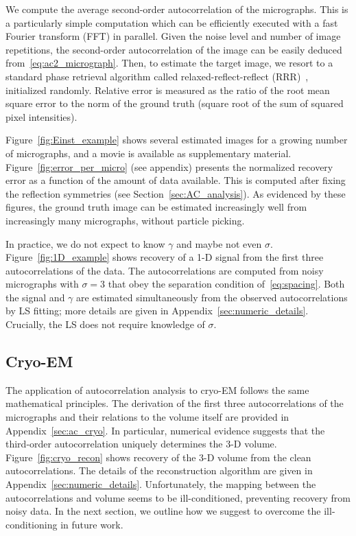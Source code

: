 \documentclass[9pt,twocolumn,twoside,lineno]{pnas-new}
\begin{document}
We compute the average second-order autocorrelation of the micrographs. This is a particularly simple computation which can be efficiently executed with a fast Fourier transform (FFT) in parallel.  
 Given the noise level and number of image repetitions, the second-order autocorrelation of the image can be easily deduced from~\eqref{eq:ac2_micrograph}.  Then, to estimate the target image, we resort to a standard phase retrieval algorithm called relaxed-reflect-reflect (RRR)~\cite{elser2017rrr}, initialized randomly.
Relative error is measured as the ratio of the root mean square error to the norm of the ground truth (square root of the sum of squared pixel intensities).

Figure~\ref{fig:Einst_example} shows several estimated images for a growing number of micrographs, and a movie is available as supplementary material. Figure~\ref{fig:error_per_micro} (see appendix) presents the normalized recovery error as a function of the amount of data available.  This is computed after fixing the reflection symmetries (see Section~\ref{sec:AC_analysis}). As evidenced by these figures, the ground truth image can be estimated increasingly well from increasingly many micrographs, without particle picking.

In practice, we do not expect to know $\gamma$ and maybe not even $\sigma$.
Figure~\ref{fig:1D_example} shows recovery of a 1-D signal from the first three autocorrelations of the data.
The autocorrelations are computed from noisy micrographs with $\sigma=3$ that obey the separation condition of~\eqref{eq:spacing}. 
Both the signal  and $\gamma$ are estimated simultaneously from the observed autocorrelations by LS fitting; more details are given in Appendix~\ref{sec:numeric_details}. Crucially, the LS does not require  knowledge of $\sigma$. 

\subsection{Cryo-EM} The application of autocorrelation analysis to cryo-EM follows the same mathematical principles.
The derivation of the first three autocorrelations of the micrographs and their relations to the volume itself are provided in Appendix~\ref{sec:ac_cryo}.
In particular, numerical evidence suggests that the third-order autocorrelation uniquely determines the 3-D volume. Figure~\ref{fig:cryo_recon} shows recovery of the 3-D volume from the clean autocorrelations. The details of the reconstruction algorithm are given in Appendix~\ref{sec:numeric_details}.
Unfortunately, the mapping between the autocorrelations and volume seems to be ill-conditioned, preventing recovery from noisy data. 
In the next section, we outline how we suggest to overcome the ill-conditioning in future work. 
\end{document}

